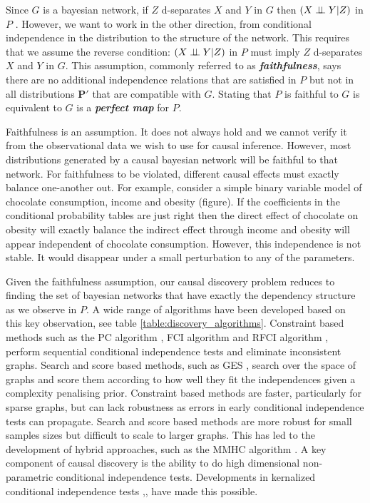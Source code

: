 \documentclass[11pt,a4paper]{article}
\begin{document}
Since $G$ is a bayesian network, if $Z$ d-separates $X$ and $Y$ in $G$ then $(X \perp\!\!\!\perp Y|Z)$ in $P$ . However, we want to work in the other direction, from conditional independence in the distribution to the structure of the network. This requires that we assume the reverse condition: $(X \perp\!\!\!\perp Y|Z)$ in $P$ must imply $Z$ d-separates $X$ and $Y$ in $G$. This assumption, commonly referred to as  \textbf{\textit{faithfulness}}, says there are no additional independence relations that are satisfied in $P$ but not in all distributions $\boldsymbol{P'}$ that are compatible with $G$. Stating that $P$ is faithful to $G$ is equivalent to $G$ is a \textbf{\textit{perfect map}} for $P$.

Faithfulness is an assumption. It does not always hold and we cannot verify it from the observational data we wish to use for causal inference. However, most distributions generated by a causal bayesian network will be faithful to that network. For faithfulness to be violated, different causal effects must exactly balance one-another out. For example, consider a simple binary variable model of chocolate consumption, income and obesity (figure). If the coefficients in the conditional probability tables are just right then the direct effect of chocolate on obesity will exactly balance the indirect effect through income and obesity will appear independent of chocolate consumption. However, this independence is not stable. It would disappear under a small perturbation to any of the parameters.  

Given the faithfulness assumption, our causal discovery problem reduces to finding the set of bayesian networks that have exactly the dependency structure as we observe in $P$. A wide range of algorithms have been developed based on this key observation, see table \ref{table:discovery_algorithms}. Constraint based methods such as the PC algorithm \cite{}, FCI algorithm \cite{} and RFCI algorithm \cite{}, perform sequential conditional independence tests and eliminate inconsistent graphs. Search and score based methods, such as GES \cite{}, search over the space of graphs and score them according to how well they fit the independences given a complexity penalising prior. Constraint based methods are faster, particularly for sparse graphs, but can lack robustness as errors in early conditional independence tests can propagate. Search and score based methods are more robust for small samples sizes but difficult to scale to larger graphs. This has led to the development of hybrid approaches, such as the MMHC algorithm \cite{}. A key component of causal discovery is the ability to do high dimensional non-parametric conditional independence tests. Developments in kernalized conditional independence tests \cite{},\cite{Zhang2012},\cite{Gretton2008} have made this possible.
\end{document}
